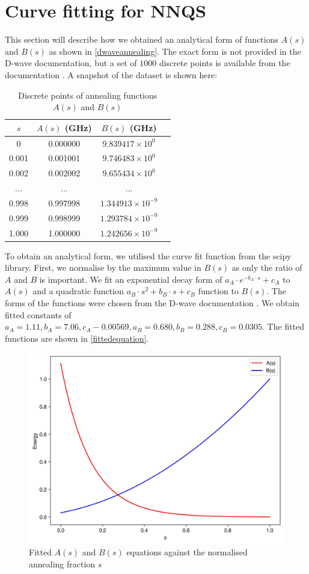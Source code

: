 \chapter{Curve fitting for NNQS}\label{appendix:curvefitting}
This section will describe how we obtained an analytical form of functions $A(s)$ and $B(s)$ as shown in \autoref{dwaveannealing}. The exact form is not provided in the D-wave documentation, but a set of $1000$ discrete points is available from the documentation \cite{dwavefunctions}. A snapshot of the dataset is shown here:
\begin{table}[!h]
    \centering
    \caption{Discrete points of annealing functions $A(s)$ and $B(s)$}
    \label{tab:dwavefunction}
    \begin{tabular}{cccc}
    \hline
    $s$ & $A(s)$ (GHz) & $B(s)$ (GHz)\\
    \hline
    0 & 0.000000 & $9.839417 \times 10^0$ \\
    0.001 & 0.001001 & $9.746483 \times 10^0$ \\
    0.002 & 0.002002 & $9.655434 \times 10^0$ \\
    ... & ... & ... \\
    0.998 & 0.997998 & $1.344913 \times 10^{-9}$\\
    0.999 & 0.998999 & $1.293784 \times 10^{-9}$\\
    1.000 & 1.000000 & $1.242656 \times 10^{-9}$\\
    \hline
    \end{tabular}
\end{table}

To obtain an analytical form, we utilised the curve fit function from the scipy library. First, we normalise by the maximum value in $B(s)$ as only the ratio of $A$ and $B$ is important. We fit an exponential decay form of $a_{A}\cdot e^{-b_{A}\cdot s} + c_{A}$ to $A(s)$ and a quadratic function $a_{B} \cdot s^2 + b_{B} \cdot s + c_{B}$ function to $B(s)$. The forms of the functions were chosen from the D-wave documentation \cite{dwavefunctions}. We obtain fitted constants of $a_{A}=1.11, b_{A} = 7.06, c_A-0.00569, a_B = 0.680, b_B = 0.288, c_B = 0.0305$. The fitted functions are shown in \autoref{fittedequation}.
\begin{figure}[!h]
    \centering
    \includegraphics[width=0.6\linewidth]{images/fitted.jpg}
    \caption{Fitted $A(s)$ and $B(s)$ equations against the normalised annealing fraction $s$}
    \label{fittedequation}
\end{figure}